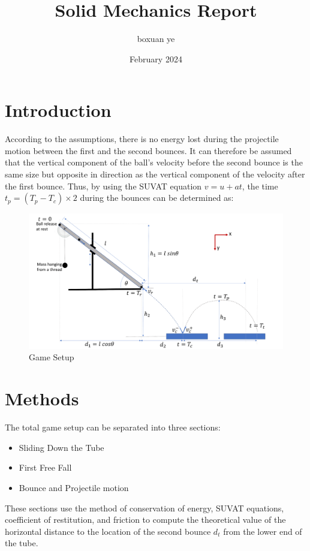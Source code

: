 \documentclass{article}
\title{Solid Mechanics Report}
\author{boxuan ye}
\date{February 2024}
\begin{document}
\maketitle

\newpage
\section{Introduction}
        According to the assumptions, there is no energy lost during the projectile motion between the first and the second bounces. It can therefore be assumed that the vertical component of the ball's velocity before the second bounce is the same size but opposite in direction as the vertical component of the velocity after the first bounce. Thus, by using the SUVAT equation $v = u + at$, the time $t_p = (T_p - T_c)\times2 $ during the bounces can be determined as:
\begin{figure}[H]
    \centering
    \includegraphics[width=1\linewidth]{Gamesetup.png}
    \caption{Game Setup}
    \label{fig:game_setup}
\end{figure}
\newpage
\section{Methods}
    The total game setup can be separated into three sections:
    \begin{itemize}
        \item Sliding Down the Tube
        \item First Free Fall
        \item Bounce and Projectile motion
    \end{itemize}
    These sections use the method of conservation of energy, SUVAT equations, coefficient of restitution, and friction to compute the theoretical value of the horizontal distance to the location of the second bounce $d_t$ from the lower end of the tube.
    
\end{document}
